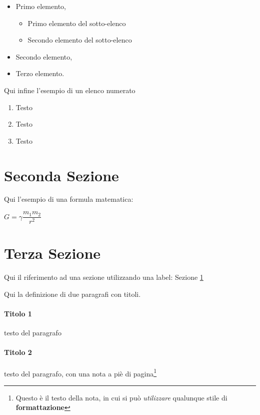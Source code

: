 \begin{itemize}
\item Primo elemento,
\begin{itemize}
\item Primo elemento del sotto-elenco
\item Secondo elemento del sotto-elenco
\end{itemize}
\item Secondo elemento,
\item Terzo elemento.
\end{itemize}

Qui infine l'esempio di un elenco numerato

\begin{enumerate}
\item Testo
\item Testo
\item Testo
\end{enumerate}

\section{Seconda Sezione}\label{sec:Sezione2}

Qui l'esempio di una formula matematica:

$ G = \gamma\dfrac{m_{1}m_{2}}{r^{2}} $

\section{Terza Sezione}

Qui il riferimento ad una sezione utilizzando una label: Sezione \ref{sec:Sezione2}

Qui la definizione di due paragrafi con titoli.

\paragraph{Titolo 1} testo del paragrafo

\paragraph{Titolo 2} testo del paragrafo, con una nota a piè di pagina\footnote{Questo è il testo della nota, in cui si può \textit{utilizzare} qualunque stile di \textbf{formattazione}}

